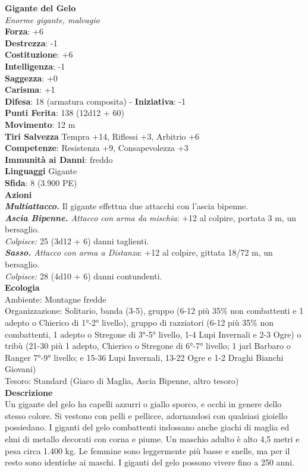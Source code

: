 \begin{multicols}{2}
\medskip\textbf{Gigante del Gelo}\\
\emph{Enorme gigante, malvagio}\\
\textbf{Forza}: +6\\
\textbf{Destrezza}: -1\\
\textbf{Costituzione}: +6\\
\textbf{Intelligenza}: -1\\
\textbf{Saggezza}: +0\\
\textbf{Carisma}: +1\\
\textbf{Difesa}: 18 (armatura composita) - \textbf{Iniziativa}: -1\\
\textbf{Punti Ferita}: 138 (12d12 + 60)\\
\textbf{Movimento}: 12 m\\
\textbf{Tiri Salvezza} Tempra +14, Riflessi +3, Arbitrio +6\\
\textbf{Competenze}: Resistenza +9, Consapevolezza +3\\
\textbf{Immunità ai Danni}: freddo\\
\textbf{Linguaggi} Gigante\\
\textbf{Sfida}: 8 (3.900 PE)\smallskip\\
\smallskip\textbf{Azioni}\\
\emph{\textbf{Multiattacco.}} Il gigante effettua due attacchi con l'ascia bipenne.\\
\emph{\textbf{Ascia Bipenne.} Attacco con arma da mischia}: +12 al colpire, portata 3 m, un bersaglio.\\
\emph{Colpisce:} 25 (3d12 + 6) danni taglienti.\\
\emph{\textbf{Sasso.} Attacco con arma a Distanza}: +12 al colpire, gittata 18/72 m, un bersaglio.\\
\emph{Colpisce:} 28 (4d10 + 6) danni contundenti.\\
\textbf{Ecologia}\\
Ambiente: Montagne fredde\\
Organizzazione: Solitario, banda (3-5), gruppo (6-12 più 35\% non combattenti e 1 adepto o Chierico di 1°-2° livello), gruppo di razziatori (6-12 più 35\% non combattenti, 1 adepto o Stregone di 3°-5° livello, 1-4 Lupi Invernali e 2-3 Ogre) o tribù (21-30 più 1 adepto, Chierico o Stregone di 6°-7° livello; 1 jarl Barbaro o Ranger 7°-9° livello; e 15-36 Lupi Invernali, 13-22 Ogre e 1-2 Draghi Bianchi Giovani)\\
Tesoro: Standard (Giaco di Maglia, Ascia Bipenne, altro tesoro)\\
\textbf{Descrizione}\\
Un gigante del gelo ha capelli azzurri o giallo sporco, e occhi in genere dello stesso colore. Si vestono con pelli e pellicce, adornandosi con qualsiasi gioiello possiedano. I giganti del gelo combattenti indossano anche giachi di maglia ed elmi di metallo decorati con corna e piume. Un maschio adulto è alto 4,5 metri e pesa circa 1.400 kg. Le femmine sono leggermente più basse e snelle, ma per il resto sono identiche ai maschi. I giganti del gelo possono vivere fino a 250 anni.\\


\end{multicols}
